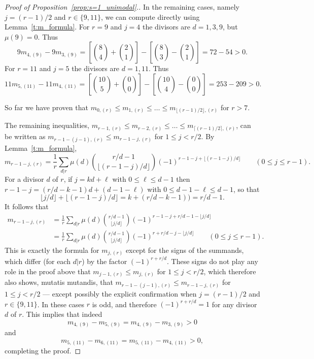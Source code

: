 \begin{proof}[Proof of Proposition~\ref{prop:s=1_unimodal}.]
	In the remaining cases, namely $j = (r-1)/2$ and $r \in \{9,11\}$, we can compute directly using 	Lemma~\ref{t:m_formula}.
	For $r=9$ and $j=4$ the divisors are $d=1,3,9$, but $\mu(9) = 0$. Thus
	\[
		9m_{4,(9)}-9m_{3,(9)} 
		= \left[ \binom{8}{4} + \binom{2}{1} \right]
		- \left[ \binom{8}{3} - \binom{2}{1} \right]
		= 72 - 54 > 0.
	\]
	For $r=11$ and $j=5$ the divisors are $d=1,11$. Thus
	\[
		11m_{5,(11)}-11m_{4,(11)} 
		= \left[ \binom{10}{5} + \binom{0}{0} \right]
		- \left[ \binom{10}{4} - \binom{0}{0} \right]
		= 253 - 209 > 0.
	\]
    
	So far we have proven that $m_{0,(r)} \le m_{1,(r)} \le \ldots \le m_{\lfloor (r-1)/2 \rfloor, (r)}$ for $r > 7$.
	
	The remaining inequalities, $m_{r-1,(r)} \le m_{r-2,(r)} \le \ldots \le m_{\lceil (r-1)/2 \rceil, (r)}$, can be written as $m_{r - 1 - (j-1),(r)} \le m_{r - 1 - j,(r)}$ for $1 \le j < r/2$.
	By Lemma~\ref{t:m_formula},
	\[
		m_{r-1-j,(r)}
		= \frac{1}{r} \sum_{d|r} \mu(d) \binom{r/d - 1}{\lfloor (r-1-j)/d \rfloor}  (-1)^{r-1-j+\lfloor (r-1-j)/d \rfloor} 
		\qquad (0 \le j \le r-1).
    \]
    For a divisor $d$ of $r$, if $j = kd + \ell$ with $0 \le \ell \le d-1$ 
    then $r-1-j = (r/d-k-1)d + (d-1-\ell)$ with $0 \le d-1-\ell \le d-1$, 
    so that
    \[
        \lfloor j/d \rfloor + \lfloor (r-1-j)/d \rfloor
        = k + (r/d-k-1)) = r/d-1.
    \]
    It follows that
	\begin{align*}
		m_{r-1-j,(r)}
		&= \frac{1}{r} \sum_{d|r} \mu(d) \binom{r/d - 1}{\lfloor j/d \rfloor}  (-1)^{r-1-j+r/d-1-\lfloor j/d \rfloor} \\
		&= \frac{1}{r} \sum_{d|r} \mu(d) \binom{r/d - 1}{\lfloor j/d \rfloor}  (-1)^{r+r/d-j-\lfloor j/d \rfloor} 
		\qquad (0 \le j \le r-1).
    \end{align*}
    This is exactly the formula for $m_{j,(r)}$ except for the signs of the summands, which differ (for each $d|r$) by the factor $(-1)^{r+r/d}$.
    These signs do not play any role in the proof above that $m_{j-1,(r)} \le m_{j,(r)}$ for $1 \le j < r/2$, which therefore also shows, mutatis mutandis, that $m_{r-1-(j-1),(r)} \le m_{r-1-j,(r)}$ for $1 \le j < r/2$ --- except possibly the explicit confirmation when $j = (r-1)/2$ and $r \in \{9,11\}$. 
    In these cases $r$ is odd, and therefore $(-1)^{r+r/d} = 1$ for any divisor $d$ of $r$.
    This implies that indeed 
	\[
		m_{4,(9)}-m_{5,(9)} 
		= m_{4,(9)}-m_{3,(9)}
		> 0
	\]
	and
	\[
		m_{5,(11)}-m_{6,(11)} 
		= m_{5,(11)}-m_{4,(11)} 
		> 0,
	\]
    completing the proof.
\end{proof}

